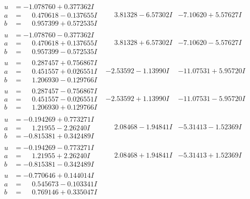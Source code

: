 \documentclass[1p]{elsarticle_modified}
\theoremstyle{definition}
\begin{document}
$$\begin{array}{c|c|c}
\begin{aligned}
u &= -1.078760 + 0.377362 I \\
a &= \phantom{-}0.470618 - 0.137655 I \\
b &= \phantom{-}0.957399 + 0.572535 I\end{aligned}
 & \phantom{-}3.81328 - 6.57302 I & -7.10620 + 5.57627 I \\ \hline\begin{aligned}
u &= -1.078760 - 0.377362 I \\
a &= \phantom{-}0.470618 + 0.137655 I \\
b &= \phantom{-}0.957399 - 0.572535 I\end{aligned}
 & \phantom{-}3.81328 + 6.57302 I & -7.10620 - 5.57627 I \\ \hline\begin{aligned}
u &= \phantom{-}0.287457 + 0.756867 I \\
a &= \phantom{-}0.451557 + 0.026551 I \\
b &= \phantom{-}1.206930 - 0.129766 I\end{aligned}
 & -2.53592 - 1.13990 I & -11.07531 + 5.95720 I \\ \hline\begin{aligned}
u &= \phantom{-}0.287457 - 0.756867 I \\
a &= \phantom{-}0.451557 - 0.026551 I \\
b &= \phantom{-}1.206930 + 0.129766 I\end{aligned}
 & -2.53592 + 1.13990 I & -11.07531 - 5.95720 I \\ \hline\begin{aligned}
u &= -0.194269 + 0.773271 I \\
a &= \phantom{-}1.21955 - 2.26240 I \\
b &= -0.815381 + 0.342489 I\end{aligned}
 & \phantom{-}2.08468 - 1.94841 I & -5.31413 - 1.52369 I \\ \hline\begin{aligned}
u &= -0.194269 - 0.773271 I \\
a &= \phantom{-}1.21955 + 2.26240 I \\
b &= -0.815381 - 0.342489 I\end{aligned}
 & \phantom{-}2.08468 + 1.94841 I & -5.31413 + 1.52369 I \\ \hline\begin{aligned}
u &= -0.770646 + 0.144014 I \\
a &= \phantom{-}0.545673 - 0.103341 I \\
b &= \phantom{-}0.769146 + 0.335047 I\end{aligned}

\end{array}$$
\end{document}

